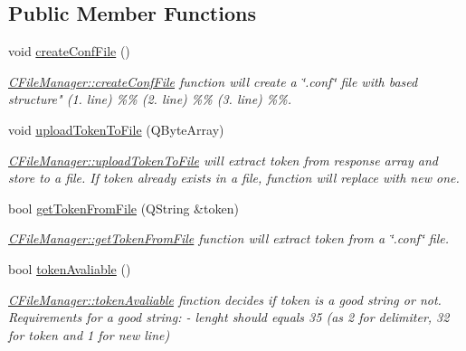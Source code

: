 \subsection*{Public Member Functions}
\begin{DoxyCompactItemize}
\item 
\mbox{\label{classCFileManager_a81677308474f52a81f3bf1bf3738a459}} 
void \hyperlink{classCFileManager_a81677308474f52a81f3bf1bf3738a459}{create\+Conf\+File} ()
\begin{DoxyCompactList}\small\item\em \hyperlink{classCFileManager_a81677308474f52a81f3bf1bf3738a459}{C\+File\+Manager\+::create\+Conf\+File} function will create a \char`\"{}.\+conf\char`\"{} file with based structure" (1. line) \%\% (2. line) \%\% (3. line) \%\%. \end{DoxyCompactList}\item 
void \hyperlink{classCFileManager_a229c63a0823679b11e34d27f72b18b1b}{upload\+Token\+To\+File} (Q\+Byte\+Array)
\begin{DoxyCompactList}\small\item\em \hyperlink{classCFileManager_a229c63a0823679b11e34d27f72b18b1b}{C\+File\+Manager\+::upload\+Token\+To\+File} will extract token from response array and store to a file. If token already exists in a file, function will replace with new one. \end{DoxyCompactList}\item 
bool \hyperlink{classCFileManager_a4021ce0a385bcf0068dff7161e96999d}{get\+Token\+From\+File} (Q\+String \&token)
\begin{DoxyCompactList}\small\item\em \hyperlink{classCFileManager_a4021ce0a385bcf0068dff7161e96999d}{C\+File\+Manager\+::get\+Token\+From\+File} function will extract token from a \char`\"{}.\+conf\char`\"{} file. \end{DoxyCompactList}\item 
bool \hyperlink{classCFileManager_ab509134180d95af83a5ad7bd51f8f9ed}{token\+Avaliable} ()
\begin{DoxyCompactList}\small\item\em \hyperlink{classCFileManager_ab509134180d95af83a5ad7bd51f8f9ed}{C\+File\+Manager\+::token\+Avaliable} finction decides if token is a good string or not. Requirements for a good string\+: -\/ lenght should equals 35 (as 2 for delimiter, 32 for token and 1 for new line) \end{DoxyCompactList}\item 

\end{DoxyCompactItemize}
